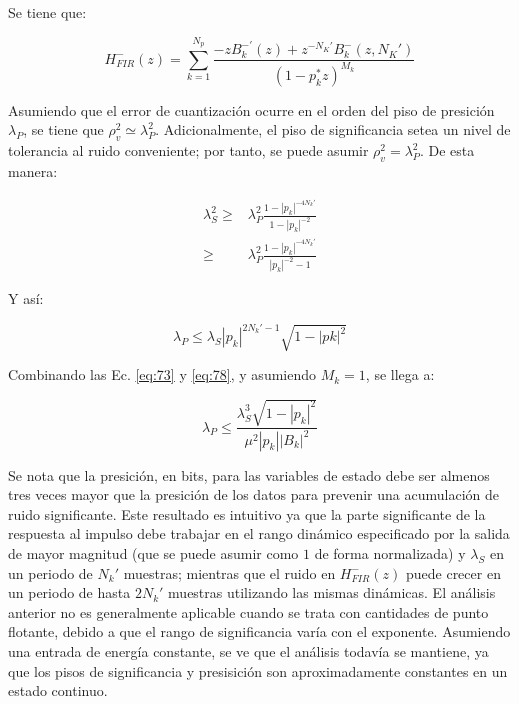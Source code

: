   Se tiene que:

  \begin{equation}
    H_{FIR}^{-}(z) = \sum_{k=1}^{N_p}{\frac{-z B_k^{-\prime}(z) + z^{-N_K'} B_k^{-}(z,N_K')}{(1-p_k^{*}z)^{M_k}}}
  \end{equation}

  Asumiendo que el error de cuantización ocurre en el orden del piso de presición $\lambda_P$, se tiene que $\rho^2_v \simeq \lambda_P^2$. Adicionalmente, el piso de significancia setea un nivel de tolerancia al ruido conveniente; por tanto, se puede asumir $\rho^2_v = \lambda_P^2$. De esta manera:

  \begin{align}
    \lambda_S^2 \geq & \lambda_P^2 \frac{1-|p_k|^{-4N_k'}}{1-|p_k|^{-2}}\\
    \geq & \lambda_P^2 \frac{1-|p_k|^{-4N_k\prime}}{|p_k|^{-2}-1}
  \end{align}

  Y así:

  \begin{equation}
    \lambda_P \leq \lambda_S |p_k|^{2N_k\prime - 1} \sqrt{1-|pk|^2}
    \label{eq:78}
  \end{equation}

  Combinando las Ec. \ref{eq:73} y \ref{eq:78}, y asumiendo $M_k = 1$, se llega a:

  \begin{equation}
    \lambda_P \leq \frac{\lambda_S^3 \sqrt{1-|p_k|^2}}{\mu^2 |p_k| |B_k|^2}
  \end{equation}

  Se nota que la presición, en bits, para las variables de estado debe ser almenos tres veces mayor que la presición de los datos para prevenir una acumulación de ruido significante. Este resultado es intuitivo ya que la parte significante de la respuesta al impulso debe trabajar en el rango dinámico especificado por la salida de mayor magnitud (que se puede asumir como $1$ de forma normalizada) y $\lambda_S$ en un periodo de $N_k\prime$ muestras; mientras que el ruido en $H_{FIR}^{-}(z)$ puede crecer en un periodo de hasta $2N_k \prime$ muestras utilizando las mismas dinámicas. El análisis anterior no es generalmente aplicable cuando se trata con cantidades de punto flotante, debido a que el rango de significancia varía con el exponente. Asumiendo una entrada de energía constante, se ve que el análisis todavía se mantiene, ya que los pisos de significancia y presisición son aproximadamente constantes en un estado continuo.

